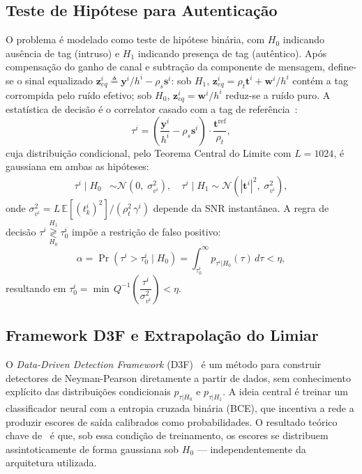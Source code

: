 \documentclass{sbrt}
\begin{document}
\subsection{Teste de Hipótese para Autenticação}\label{sec:hip}

O problema é modelado como teste de hipótese binária, com $H_0$ indicando ausência de tag (intruso) e $H_1$ indicando presença de tag (autêntico). Após compensação do ganho de canal e subtração da componente de mensagem, define-se o sinal equalizado $\mathbf{z}_{eq}^i \triangleq \mathbf{y}^i/h^i - \rho_s \mathbf{s}^i$: sob $H_1$, $\mathbf{z}_{eq}^i = \rho_t \mathbf{t}^i + \mathbf{w}^i/h^i$ contém a tag corrompida pelo ruído efetivo; sob $H_0$, $\mathbf{z}_{eq}^i = \mathbf{w}^i/h^i$ reduz-se a ruído puro. A estatística de decisão é o correlator casado com a tag de referência~\cite{ref_joao}:
\begin{equation}\label{eq:tau}
    \tau^i = \left(\frac{\mathbf{y}^i}{h^i} - \rho_s \mathbf{s}^i\right) \cdot \frac{\mathbf{t}^{\mathrm{ref}}}{\rho_t},
\end{equation}
cuja distribuição condicional, pelo Teorema Central do Limite com $L = 1024$, é gaussiana em ambas as hipóteses:
\begin{align}
    \tau^i \mid H_0 &\sim \mathcal{N}\!\left(0,\; \sigma_{v^i}^2\right),\quad
    \tau^i \mid H_1 \sim \mathcal{N}\!\left(|\mathbf{t}^i|^2,\; \sigma_{v^i}^2\right), \label{eq:dists}
\end{align}
onde $\sigma_{v^i}^2 = L\,\mathbb{E}[(t^i_k)^2]/(\rho_t^2\,\gamma^i)$ depende da SNR instantânea. A regra de decisão $\tau^i \underset{H_0}{\overset{H_1}{\gtrless}} \tau^i_0$ impõe a restrição de falso positivo:
\begin{equation}\label{eq:alpha}
    \alpha = \Pr(\tau^i > \tau_0^i \mid H_0) = \int_{\tau_0^i}^{\infty} p_{\tau^i|H_0}(\tau)\,d\tau < \eta,
\end{equation}
resultando em $\tau^i_0 = \min\,Q^{-1}\!\left(\dfrac{\tau^i}{\sigma^2_{v^i}}\right) < \eta$.

\subsection{Framework D3F e Extrapolação do Limiar}\label{sec:d3f}

O \textit{Data-Driven Detection Framework} (D3F)~\cite{ref_braca} é um método para construir detectores de Neyman-Pearson diretamente a partir de dados, sem conhecimento explícito das distribuições condicionais $p_{\tau|H_0}$ e $p_{\tau|H_1}$. A ideia central é treinar um classificador neural com a entropia cruzada binária (BCE), que incentiva a rede a produzir escores de saída calibrados como probabilidades. O resultado teórico chave de~\cite{ref_braca} é que, sob essa condição de treinamento, os escores se distribuem assintoticamente de forma gaussiana sob $H_0$ — independentemente da arquitetura utilizada.
\end{document}

